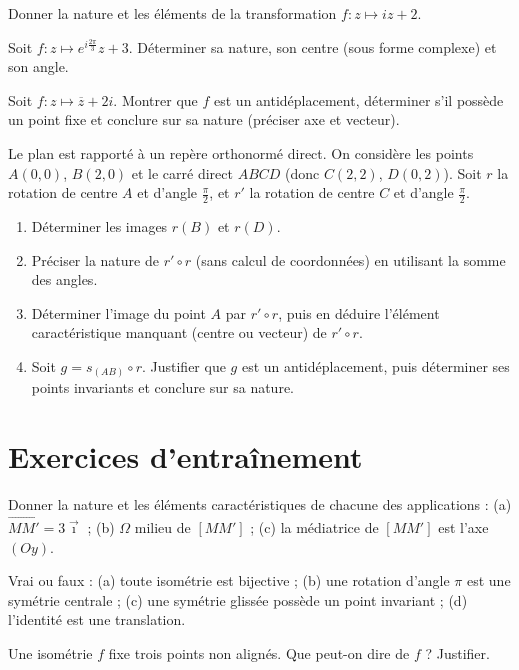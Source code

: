 \exo{} Donner la nature et les éléments de la transformation $f:z\mapsto iz+2$.

\exo{} Soit $f:z\mapsto e^{i\frac{2\pi}{3}}z+3$. Déterminer sa nature, son centre (sous forme complexe) et son angle.

\exo{} Soit $f:z\mapsto \overline z+2i$. Montrer que $f$ est un antidéplacement, déterminer s'il possède un point fixe et conclure sur sa nature (préciser axe et vecteur).

\exo{} Le plan est rapporté à un repère orthonormé direct. On considère les points $A(0,0)$, $B(2,0)$ et le carré direct $ABCD$ (donc $C(2,2)$, $D(0,2)$). Soit $r$ la rotation de centre $A$ et d'angle $\frac\pi2$, et $r'$ la rotation de centre $C$ et d'angle $\frac\pi2$.
\begin{enumerate}[label=\arabic*)]
\item Déterminer les images $r(B)$ et $r(D)$.
\item Préciser la nature de $r'\circ r$ (sans calcul de coordonnées) en utilisant la somme des angles.
\item Déterminer l'image du point $A$ par $r'\circ r$, puis en déduire l'élément caractéristique manquant (centre ou vecteur) de $r'\circ r$.
\item Soit $g=s_{(AB)}\circ r$. Justifier que $g$ est un antidéplacement, puis déterminer ses points invariants et conclure sur sa nature.
\end{enumerate}

\section{Exercices d'entraînement}

\exo{} Donner la nature et les éléments caractéristiques de chacune des applications : (a) $\overrightarrow{MM'}=3\vec\imath$ ; (b) $\Omega$ milieu de $[MM']$ ; (c) la médiatrice de $[MM']$ est l'axe $(Oy)$.

\exo{} Vrai ou faux : (a) toute isométrie est bijective ; (b) une rotation d'angle $\pi$ est une symétrie centrale ; (c) une symétrie glissée possède un point invariant ; (d) l'identité est une translation.

\exo{} Une isométrie $f$ fixe trois points non alignés. Que peut-on dire de $f$ ? Justifier.

